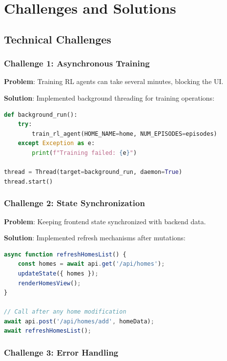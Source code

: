 \documentclass[12pt,a4paper]{article}
\begin{document}
\section{Challenges and Solutions}

\subsection{Technical Challenges}

\subsubsection{Challenge 1: Asynchronous Training}

\textbf{Problem}: Training RL agents can take several minutes, blocking the UI.

\textbf{Solution}: Implemented background threading for training operations:
\begin{lstlisting}[language=Python]
def background_run():
    try:
        train_rl_agent(HOME_NAME=home, NUM_EPISODES=episodes)
    except Exception as e:
        print(f"Training failed: {e}")

thread = Thread(target=background_run, daemon=True)
thread.start()
\end{lstlisting}

\subsubsection{Challenge 2: State Synchronization}

\textbf{Problem}: Keeping frontend state synchronized with backend data.

\textbf{Solution}: Implemented refresh mechanisms after mutations:
\begin{lstlisting}[language=JavaScript]
async function refreshHomesList() {
    const homes = await api.get('/api/homes');
    updateState({ homes });
    renderHomesView();
}

// Call after any home modification
await api.post('/api/homes/add', homeData);
await refreshHomesList();
\end{lstlisting}

\subsubsection{Challenge 3: Error Handling}
\end{document}
